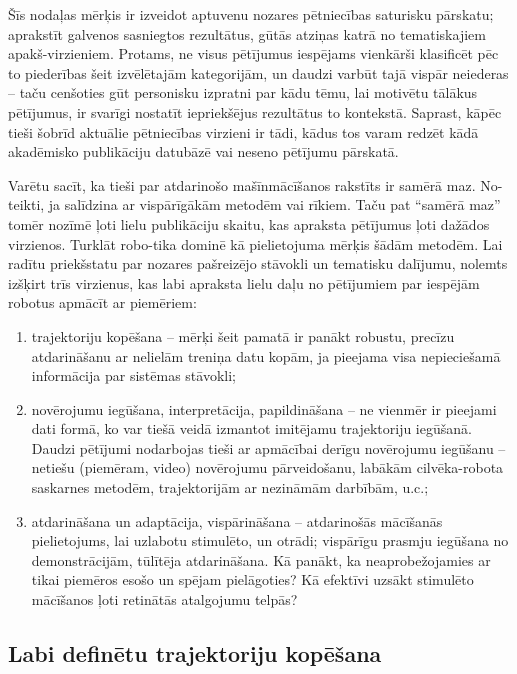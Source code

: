 \documentclass[12pt, a4paper]{article}
\numberwithin{equation}{section} %
\begin{document}
Šīs nodaļas mērķis ir izveidot aptuvenu nozares pētniecības saturisku pārskatu; aprakstīt galvenos sasniegtos rezultātus, gūtās atziņas katrā no tematiskajiem apakš-virzieniem. Protams, ne visus pētījumus iespējams vienkārši klasificēt pēc to piederības šeit izvēlētajām kategorijām, un daudzi varbūt tajā vispār neiederas -- taču cenšoties gūt personisku izpratni par kādu tēmu, lai motivētu tālākus pētījumus, ir svarīgi nostatīt iepriekšējus rezultātus to kontekstā. Saprast, kāpēc tieši šobrīd aktuālie pētniecības virzieni ir tādi, kādus tos varam redzēt kādā akadēmisko publikāciju datubāzē vai neseno pētījumu pārskatā.

Varētu sacīt, ka tieši par atdarinošo mašīnmācīšanos rakstīts ir samērā maz. No-teikti, ja salīdzina ar vispārīgākām metodēm vai rīkiem. Taču pat ``samērā maz'' tomēr nozīmē ļoti lielu publikāciju skaitu, kas apraksta pētījumus ļoti dažādos virzienos. Turklāt robo-tika dominē kā pielietojuma mērķis šādām metodēm. Lai radītu priekšstatu par nozares pašreizējo stāvokli un tematisku dalījumu, nolemts izšķirt trīs virzienus, kas labi apraksta lielu daļu no pētījumiem par iespējām robotus apmācīt ar piemēriem:

\begin{enumerate}
    \item trajektoriju kopēšana -- mērķi šeit pamatā ir panākt robustu, precīzu atdarināšanu ar nelielām treniņa datu kopām, ja pieejama visa nepieciešamā informācija par sistēmas stāvokli;
    \item novērojumu iegūšana, interpretācija, papildināšana -- ne vienmēr ir pieejami dati formā, ko var tiešā veidā izmantot imitējamu trajektoriju iegūšanā. Daudzi pētījumi nodarbojas tieši ar apmācībai derīgu novērojumu iegūšanu -- netiešu (piemēram, video) novērojumu pārveidošanu, labākām cilvēka-robota saskarnes metodēm, trajektorijām ar nezināmām darbībām, u.c.;
    \item atdarināšana un adaptācija, vispārināšana -- atdarinošās mācīšanās pielietojums, lai uzlabotu stimulēto, un otrādi; vispārīgu prasmju iegūšana no demonstrācijām, tūlītēja atdarināšana. Kā panākt, ka neaprobežojamies ar tikai piemēros esošo un spējam pielāgoties? Kā efektīvi uzsākt stimulēto mācīšanos ļoti retinātās atalgojumu telpās?
\end{enumerate}

\subsection{Labi definētu trajektoriju kopēšana}
\end{document}
